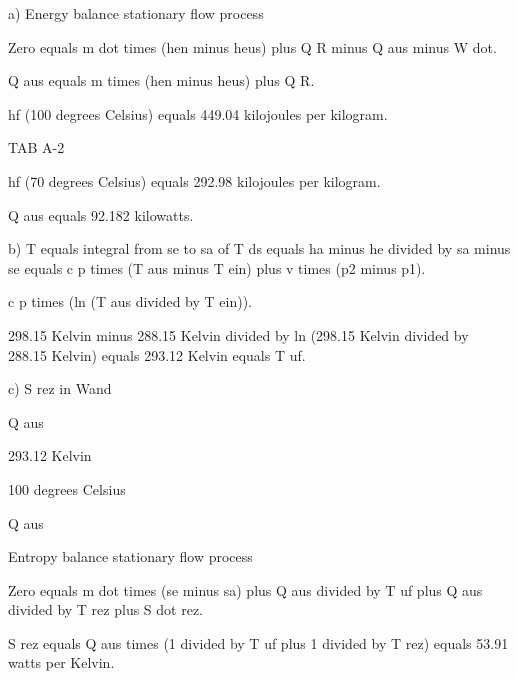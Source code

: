 a) Energy balance stationary flow process

Zero equals m dot times (hen minus heus) plus Q R minus Q aus minus W dot.

Q aus equals m times (hen minus heus) plus Q R.

hf (100 degrees Celsius) equals 449.04 kilojoules per kilogram.

TAB A-2

hf (70 degrees Celsius) equals 292.98 kilojoules per kilogram.

Q aus equals 92.182 kilowatts.

b) T equals integral from se to sa of T ds equals ha minus he divided by sa minus se equals c p times (T aus minus T ein) plus v times (p2 minus p1).

c p times (ln (T aus divided by T ein)).

298.15 Kelvin minus 288.15 Kelvin divided by ln (298.15 Kelvin divided by 288.15 Kelvin) equals 293.12 Kelvin equals T uf.

c) S rez in Wand

Q aus

293.12 Kelvin

100 degrees Celsius

Q aus

Entropy balance stationary flow process

Zero equals m dot times (se minus sa) plus Q aus divided by T uf plus Q aus divided by T rez plus S dot rez.

S rez equals Q aus times (1 divided by T uf plus 1 divided by T rez) equals 53.91 watts per Kelvin.